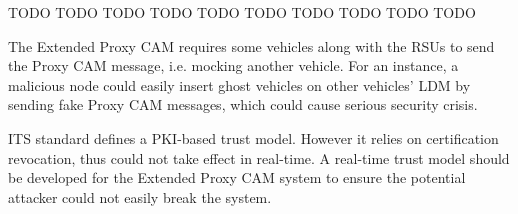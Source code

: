 TODO TODO TODO TODO TODO TODO TODO TODO TODO TODO

The Extended Proxy CAM requires some vehicles along with the RSUs to send the Proxy CAM message, i.e. mocking another vehicle.
For an instance, a malicious node could easily insert ghost vehicles on other vehicles' LDM by sending fake Proxy CAM messages, which could cause serious security crisis.

ITS standard defines a PKI-based trust model. However it relies on certification revocation, thus could not take effect in real-time.
A real-time trust model should be developed for the Extended Proxy CAM system to ensure the potential attacker could not easily break the system.

